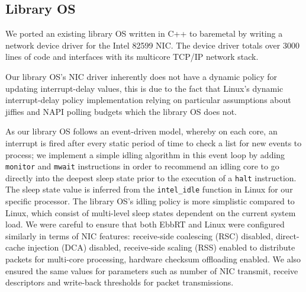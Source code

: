 
\subsection{Library OS}
We ported an existing library OS written in C++ to baremetal by writing a
network device driver for the Intel 82599 NIC. The device driver totals over
3000 lines of code and interfaces with its multicore TCP/IP network stack.

Our library OS's NIC driver inherently does not have a dynamic policy for
updating interrupt-delay values, this is due to the fact that Linux's dynamic
interrupt-delay policy implementation relying on particular assumptions about
jiffies and NAPI polling budgets which the library OS does not.

As our library OS follows an event-driven model, whereby on each core, an
interrupt is fired after every static period of time to check a list for new
events to process; we implement a simple idling algorithm in this event loop by
adding \texttt{monitor} and \texttt{mwait} instructions in order to recommend
an idling core to go directly into the deepest sleep state prior to the
execution of a \texttt{halt} instruction. The sleep state value is inferred
from the \texttt{intel\_idle} function in Linux for our specific processor. The
library OS's idling policy is more simplistic compared to Linux, which consist
of multi-level sleep states dependent on the current system load.
We were careful to ensure that both EbbRT and Linux were configured similarly
in terms of NIC features: receive-side coalescing (RSC) disabled, direct-cache
injection (DCA) disabled, receive-side scaling (RSS) enabled to distribute
packets for multi-core processing, hardware checksum offloading enabled. We
also ensured the same values for parameters such as number of NIC transmit,
receive descriptors and write-back thresholds for packet transmissions.


